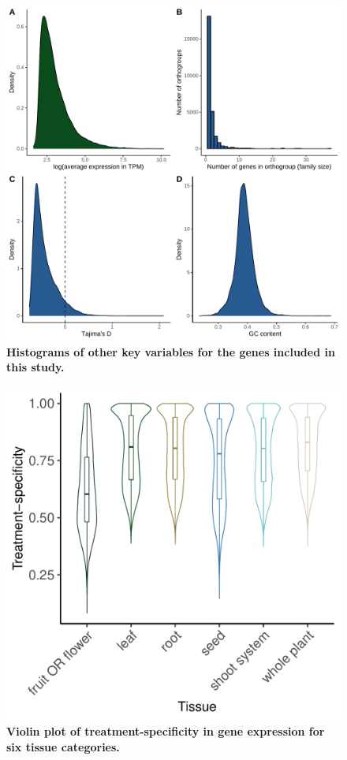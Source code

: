 \documentclass[12pt]{article}
\begin{document}
\begin{figure}[H]
\centering
\includegraphics[width = \linewidth]{figures/appendix_a/histogramsOfMoreKeyVariables.pdf}
\caption{\textbf{Histograms of other key variables for the genes included in this study.}}%
\end{figure}

\newpage

\begin{figure}[H]
\centering
\includegraphics[width = \linewidth]{figures/appendix_a/densityPlotsOfTreatmentSpecificity.pdf}
\caption{\textbf{Violin plot of treatment-specificity in gene expression for six tissue categories.}}%
\end{figure}
\end{document}
